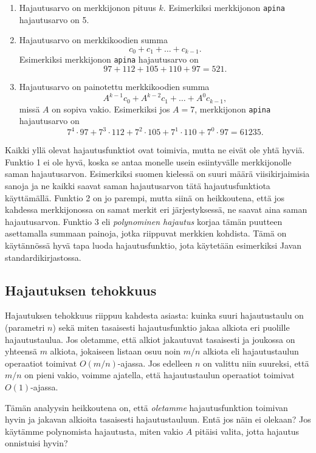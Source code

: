 \begin{enumerate}
\item Hajautusarvo on merkkijonon pituus $k$.
Esimerkiksi merkkijonon \texttt{apina} hajautusarvo on 5.
\item Hajautusarvo on merkkikoodien summa
\[ c_0 + c_1 + \dots + c_{k-1}.\]
Esimerkiksi merkkijonon \texttt{apina} hajautusarvo on
\[97+112+105+110+97=521.\]
\item Hajautusarvo on painotettu merkkikoodien summa
\[ A^{k-1} c_0 + A^{k-2} c_1 + \dots + A^0 c_{k-1},\]
missä $A$ on sopiva vakio.
Esimerkiksi jos $A=7$, merkkijonon \texttt{apina} hajautusarvo on
\[7^4 \cdot 97+7^3 \cdot 112+7^2 \cdot 105+7^1 \cdot 110+7^0 \cdot 97=61235.\]
\end{enumerate}

Kaikki yllä olevat hajautusfunktiot ovat toimivia,
mutta ne eivät ole yhtä hyviä.
Funktio 1 ei ole hyvä, koska se antaa monelle
usein esiintyvälle merkkijonolle saman hajautusarvon.
Esimerkiksi suomen kielessä on suuri määrä viisikirjaimisia
sanoja ja ne kaikki saavat saman hajautusarvon tätä
hajautusfunktiota käyttämällä.
Funktio 2 on jo parempi, mutta siinä on heikkoutena,
että jos kahdessa merkkijonossa on samat merkit eri
järjestyksessä, ne saavat aina saman hajautusarvon.
Funktio 3 eli \emph{polynominen hajautus} korjaa tämän puutteen
asettamalla summaan painoja, jotka riippuvat merkkien kohdista.
Tämä on käytännössä hyvä tapa luoda hajautusfunktio,
jota käytetään esimerkiksi Javan standardikirjastossa.

\subsection{Hajautuksen tehokkuus}

Hajautuksen tehokkuus riippuu kahdesta asiasta:
kuinka suuri hajautustaulu on (parametri $n$)
sekä miten tasaisesti hajautusfunktio jakaa alkiota
eri puolille hajautustaulua.
Jos oletamme, että alkiot jakautuvat tasaisesti
ja joukossa on yhteensä $m$ alkiota,
jokaiseen listaan osuu noin $m/n$ alkiota
eli hajautustaulun operaatiot toimivat $O(m/n)$-ajassa.
Jos edelleen $n$ on valittu niin suureksi,
että $m/n$ on pieni vakio, voimme ajatella,
että hajautustaulun operaatiot toimivat $O(1)$-ajassa.

Tämän analyysin heikkoutena on, että \emph{oletamme}
hajautusfunktion toimivan hyvin ja jakavan alkioita
tasaisesti hajautustauluun. Entä jos näin ei olekaan?
Jos käytämme polynomista hajautusta, miten vakio $A$
pitäisi valita, jotta hajautus onnistuisi hyvin?

